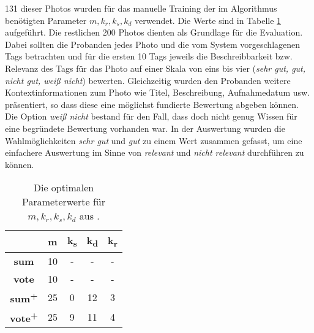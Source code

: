   131 dieser Photos wurden für das manuelle Training der im Algorithmus benötigten Parameter $m,	k_r,	k_s, k_d $ verwendet. Die Werte sind in Tabelle \ref{tab:optimalParameterBjoern} aufgeführt. Die restlichen 200 Photos dienten als Grundlage für die Evaluation. Dabei sollten die Probanden jedes Photo und die vom System vorgeschlagenen Tags betrachten und für die ersten 10 Tags jeweils die Beschreibbarkeit bzw. Relevanz des Tags für das Photo auf einer Skala von eins bis vier (\emph{sehr gut, gut, nicht gut, weiß nicht}) bewerten. Gleichzeitig wurden den Probanden weitere Kontextinformationen zum Photo wie Titel, Beschreibung, Aufnahmedatum usw. präsentiert, so dass diese eine möglichst fundierte Bewertung abgeben können. Die Option \emph{weiß nicht} bestand für den Fall, dass doch nicht genug Wissen für eine begründete Bewertung vorhanden war. In der Auswertung wurden die Wahlmöglichkeiten \emph{sehr gut} und \emph{gut} zu einem Wert zusammen gefasst, um eine einfachere Auswertung im Sinne von \emph{relevant} und \emph{nicht relevant} durchführen zu können.
  
\begin{table}[htbp]
  \centering
  \begin{tabular}{ccccc}
    \hline
     & \textbf{m} & \textbf{k\textsubscript{s}} & \textbf{k\textsubscript{d}} & \textbf{k\textsubscript{r}}\\
    \hline                          
    \textbf{sum} & 10 & - & - & -\\
    \hline                          
    \textbf{vote} & 10 & - & - & -\\
    \hline                          
    \textbf{sum\textsuperscript{+}} & 25 & 0 & 12 & 3\\
    \hline                          
    \textbf{vote\textsuperscript{+}} & 25 & 9 & 11 & 4\\
    \hline
  \end{tabular}
  \caption{Die optimalen Parameterwerte für $m,	k_r,	k_s, k_d$ aus \cite{collectiveKnowledge}.}
  \label{tab:optimalParameterBjoern}
\end{table}



